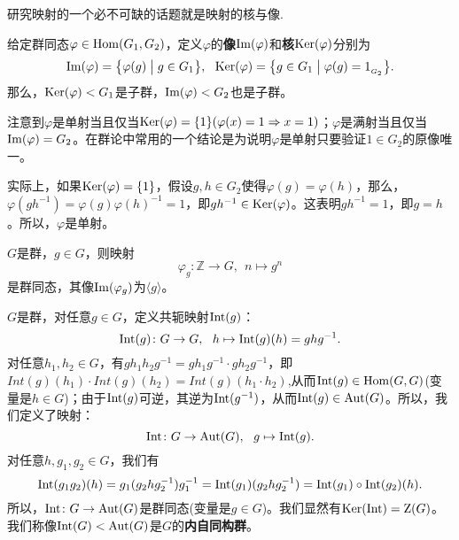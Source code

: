 \documentclass[lang=cn,10pt]{elegantbook}
\begin{document}
	研究映射的一个必不可缺的话题就是映射的核与像.
	\begin{definition}[群同态的像与核]
		给定群同态$\varphi\in {\rm Hom}(G_1,G_2)$，定义$\varphi$的{\bf 像}${\rm Im}(\varphi)$和{\bf 核}${\rm Ker}(\varphi)$分别为
		\[{\rm Im}(\varphi)=\big\{\varphi(g) \bigm|g\in G_1\big\}, \ \ {\rm Ker}(\varphi)=\big\{g\in G_1\bigm|\varphi(g)=1_{_{G_2}}\big\}.\]
		那么，${\rm Ker}(\varphi)<G_1$是子群，${\rm Im}(\varphi)<G_2$也是子群。
		
		注意到$\varphi$是单射当且仅当${\rm Ker}(\varphi)=\{1\}(\varphi(x)=1\Rightarrow x=1)$；$\varphi$是满射当且仅当${\rm Im}(\varphi)=G_2$。在群论中常用的一个结论是为说明$\varphi$是单射只要验证$1\in G_2$的原像唯一。
		
		实际上，如果${\rm Ker}(\varphi)=\{1\}$，假设$g,h\in G_2$使得$\varphi(g)=\varphi(h)$，那么，$\varphi(gh^{-1})=\varphi(g)\varphi(h)^{-1}=1$，即$gh^{-1}\in {\rm Ker}(\varphi)$。这表明$gh^{-1}=1$，即$g=h$。所以，$\varphi$是单射。
	\end{definition}
	\begin{example}
		$G$是群，$g\in G$，则映射
		\[\varphi_g\colon\mathbb{Z}\rightarrow G, \ \ n\mapsto g^n
		\]
		是群同态，其像${\rm Im}(\varphi_g)$为$\langle g\rangle$。
	\end{example}
	\begin{definition}[共轭映射]
		$G$是群，对任意$g\in G$，定义共轭映射${\rm Int}(g)$：
		\[{\rm Int}(g)\colon G\rightarrow G, \ \ h \mapsto {\rm Int}(g)(h)=ghg^{-1}.
		\]
		对任意$h_1,h_2\in G$，有$gh_1h_2g^{-1}=gh_1g^{-1}\cdot gh_2g^{-1}$，即\(Int(g)(h_1)\cdot Int(g)(h_2)=Int(g)(h_1\cdot h_2)\),从而${\rm Int}(g)\in {\rm Hom}(G,G)$(变量是\(h\in G\))；由于${\rm Int}(g)$可逆，其逆为${\rm Int}(g^{-1})$，从而${\rm Int}(g)\in {\rm Aut}(G)$。所以，我们定义了映射：
		\[{\rm Int}\colon G\rightarrow {\rm Aut}(G), \ \ g\mapsto {\rm Int}(g).\]
		对任意$h,g_1,g_2\in G$，我们有
		\[ {\rm Int}(g_1g_2)(h)=g_1(g_2hg_2^{-1})g_1^{-1}= {\rm Int}(g_1)(g_2hg_2^{-1})={\rm Int}(g_1)\circ {\rm Int}(g_2)(h).\]
		所以，${\rm Int}\colon G\rightarrow {\rm Aut}(G)$是群同态(变量是\(g\in G\))。我们显然有${\rm Ker}({\rm Int})={\rm Z}(G)$。我们称像${\rm Int}(G)< {\rm Aut}(G)$是$G$的{\bf 内自同构群}。
	\end{definition}
	
\end{document}
